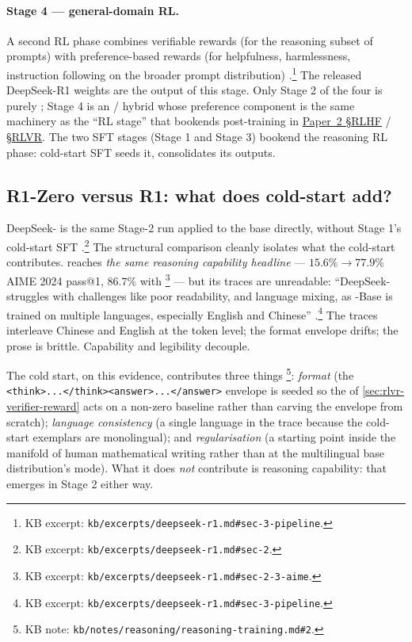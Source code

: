 \paragraph{Stage 4 --- general-domain RL.} A second RL phase combines
verifiable rewards (for the reasoning subset of prompts) with
preference-based rewards (for helpfulness, harmlessness, instruction
following on the broader prompt distribution) \citep[\S
3]{deepseek-r1}.\footnote{KB excerpt:
\texttt{kb/excerpts/deepseek-r1.md\#sec-3-pipeline}.} The released
DeepSeek-R1 weights are the output of this stage. Only Stage 2 of the
four is purely ; Stage 4 is an / hybrid whose preference
component is the same machinery as the ``RL stage'' that bookends
post-training in \hyperref[P2-sec:rlhf]{Paper~2 §RLHF} / \hyperref[P2-sec:rlvr-grpo]{§RLVR}. The two SFT stages (Stage 1 and
Stage 3) bookend the reasoning RL phase: cold-start SFT seeds it,
 consolidates its outputs.

\subsection{R1-Zero versus R1: what does cold-start add?}
\label{sec:r1-zero-vs-r1}

DeepSeek- is the same Stage-2  run applied to the
 base directly, without Stage 1's cold-start SFT
\citep[\S 2]{deepseek-r1}.\footnote{KB excerpt:
\texttt{kb/excerpts/deepseek-r1.md\#sec-2}.} The structural
comparison cleanly isolates what the cold-start contributes. 
reaches \emph{the same reasoning capability headline} ---
$15.6\%\!\to\!77.9\%$ AIME 2024 pass@1, $86.7\%$ with
 \citep[\S 2.3]{deepseek-r1}\footnote{KB excerpt:
\texttt{kb/excerpts/deepseek-r1.md\#sec-2-3-aime}.} --- but its
traces are unreadable: ``DeepSeek- struggles with challenges
like poor readability, and language mixing, as -Base is
trained on multiple languages, especially English and Chinese''
\citep[\S 3]{deepseek-r1}.\footnote{KB excerpt:
\texttt{kb/excerpts/deepseek-r1.md\#sec-3-pipeline}.} The traces
interleave Chinese and English at the token level; the format
envelope drifts; the prose is brittle. Capability and legibility
decouple.

The cold start, on this evidence, contributes three things
\citep[\S 3]{deepseek-r1}\footnote{KB note:
\texttt{kb/notes/reasoning/reasoning-training.md\#2}.}: \emph{format}
(the \texttt{<think>...</think><answer>...</answer>} envelope is
seeded so the  of \cref{sec:rlvr-verifier-reward} acts
on a non-zero baseline rather than carving the envelope from
scratch); \emph{language consistency} (a single language in the trace
because the cold-start exemplars are monolingual); and
\emph{regularisation} (a starting point inside the manifold of human
mathematical writing rather than at the multilingual base
distribution's mode). What it does \emph{not} contribute is reasoning
capability: that emerges in Stage 2 either way.

